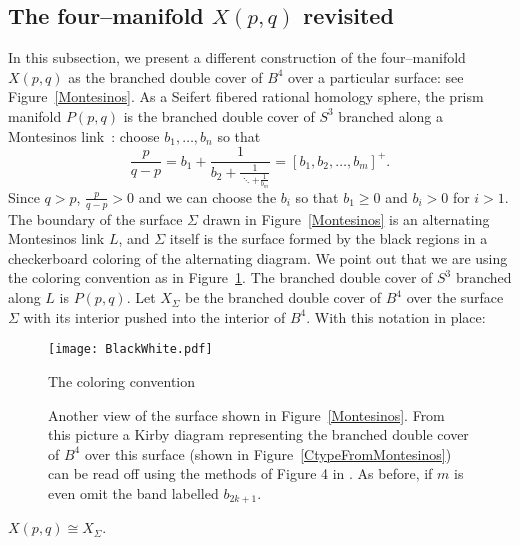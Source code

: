 \subsection{The four--manifold $X(p,q)$ revisited}

In this subsection, we present a different construction of the four--manifold $X(p,q)$ as the branched double cover of $B^4$ over a particular surface: see Figure~\ref{Montesinos}. As a Seifert fibered rational homology sphere, the prism manifold $P(p,q)$ is the branched double cover of $S^3$ branched along a Montesinos link~\cite{Montesinos1973}: choose $b_1,\dots,b_n$ so that
\begin{equation}
\frac{p}{q-p} = b_1 + \frac{1}{b_2 + \displaystyle \frac{1}{ \ddots + \displaystyle \frac{1}{b_m}}} = [b_1,b_2,\dots,b_m]^+.
\end{equation}
Since $q > p$, $\frac{p}{q-p} > 0$ and we can choose the $b_i$ so that $b_1 \ge 0$ and $b_i > 0$ for $i > 1$. The boundary of the surface $\Sigma$ drawn in Figure~\ref{Montesinos} is an alternating Montesinos link $L$, and $\Sigma$ itself is the surface formed by the black regions in a checkerboard coloring of the alternating diagram. We point out that we are using the coloring convention as in Figure~\ref{convention}. The branched double cover of $S^3$ branched along $L$ is $P(p,q)$. Let $X_{\Sigma}$ be the branched double cover of $B^4$ over the surface $\Sigma$ with its interior pushed into the interior of $B^4$. With this notation in place:

\begin{figure}[t]
\texttt{[image: BlackWhite.pdf]}
\caption{The coloring convention}
\label{convention}
\end{figure}

\begin{figure}

\centering
\def\svgwidth{.8\textwidth}

\caption{Another view of the surface shown in Figure~\ref{Montesinos}. From this picture a Kirby diagram representing the branched double cover of $B^4$ over this surface (shown in Figure~\ref{CtypeFromMontesinos}) can be read off using the methods of Figure 4 in \cite{AkbulutKirby1980}. As before, if $m$ is even omit the band labelled $b_{2k+1}$.}\label{SlidMontesinos}

\end{figure}

\begin{prop}\label{BDC}
$X(p,q)\cong X_\Sigma$.
\end{prop}


